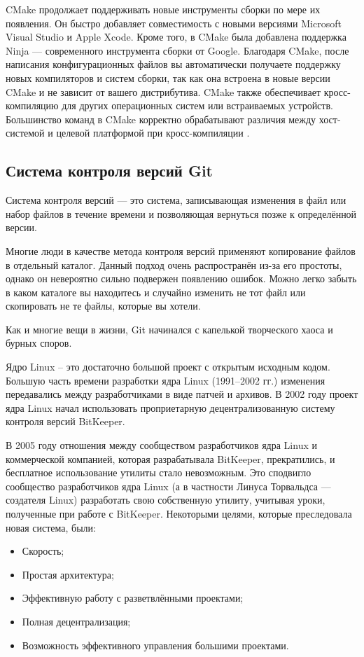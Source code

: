 CMake продолжает поддерживать новые инструменты сборки по мере их появления. Он быстро добавляет совместимость с новыми версиями Microsoft Visual Studio и Apple Xcode. Кроме того, в CMake была добавлена поддержка Ninja — современного инструмента сборки от Google. Благодаря CMake, после написания конфигурационных файлов вы автоматически получаете поддержку новых компиляторов и систем сборки, так как она встроена в новые версии CMake и не зависит от вашего дистрибутива. CMake также обеспечивает кросс-компиляцию для других операционных систем или встраиваемых устройств. Большинство команд в CMake корректно обрабатывают различия между хост-системой и целевой платформой при кросс-компиляции \cite{CMake}.

\subsection{Система контроля версий Git}

Система контроля версий — это система, записывающая изменения в файл или набор файлов в течение времени и позволяющая вернуться позже к определённой версии.

Многие люди в качестве метода контроля версий применяют копирование файлов в
отдельный каталог. Данный подход очень распространён из-за его простоты, однако он невероятно сильно подвержен появлению ошибок. Можно легко забыть в каком каталоге вы находитесь и случайно изменить не тот файл или скопировать не те файлы, которые вы хотели.

Как и многие вещи в жизни, Git начинался с капелькой творческого хаоса и бурных споров.

Ядро Linux -- это достаточно большой проект с открытым исходным кодом. Большую часть времени разработки ядра Linux (1991–2002 гг.) изменения передавались между разработчиками в виде патчей и архивов. В 2002 году проект ядра Linux начал использовать проприетарную децентрализованную систему контроля версий BitKeeper.

В 2005 году отношения между сообществом разработчиков ядра Linux и коммерческой компанией, которая разрабатывала BitKeeper, прекратились, и бесплатное использование утилиты стало невозможным. Это сподвигло сообщество разработчиков ядра Linux (а в частности Линуса Торвальдса — создателя Linux) разработать свою собственную утилиту, учитывая уроки, полученные при работе с BitKeeper. Некоторыми целями, которые преследовала новая система, были:
\begin{itemize}
	\item Скорость;
	\item Простая архитектура;
	\item Эффективную работу с разветвлёнными проектами;
	\item Полная децентрализация;
	\item Возможность эффективного управления большими проектами.
\end{itemize}

